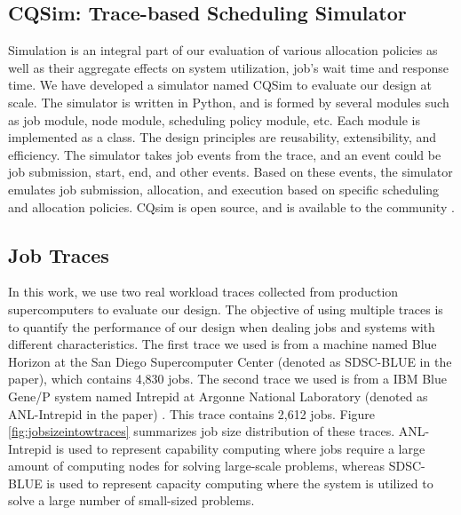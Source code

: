 \documentclass[conference]{IEEEtran}
\begin{document}
\subsection{CQSim: Trace-based Scheduling Simulator}

Simulation is an integral part of our evaluation of various allocation policies
as well as their aggregate effects on system utilization, job's wait time and
response time. We have developed a simulator named CQSim to evaluate our design
at scale. The simulator is written in Python, and is formed by several modules
such as job module, node module, scheduling policy module, etc. Each module is
implemented as a class. The design principles are reusability, extensibility,
and efficiency. The simulator takes job events from the trace, and an event could be
job submission, start, end, and other events. Based on these events, the
simulator emulates job submission, allocation, and execution based on specific
scheduling and allocation policies. CQsim is open source, and is available to the
community \cite{Cqsim}.  \\



\subsection{Job Traces}
\label{sec:job traces}

In this work, we use two real workload traces collected from production
supercomputers to evaluate our design. The objective of using multiple traces is
to quantify the performance of our design when dealing jobs and systems with
different characteristics. The first trace we used is from a machine named Blue Horizon at
the San Diego Supercomputer Center (denoted as SDSC-BLUE in the paper), which
contains 4,830 jobs. The second trace we used is from a IBM Blue Gene/P system
named Intrepid at Argonne National Laboratory (denoted as ANL-Intrepid in the paper)
\cite{par}. This trace contains 2,612 jobs. Figure \ref{fig:jobsizeintowtraces}
summarizes job size distribution of these traces. ANL-Intrepid is used to
represent capability computing where jobs require a large amount of computing
nodes for solving large-scale problems, whereas SDSC-BLUE is used to represent
capacity computing where the system is utilized to solve a large number of
small-sized problems.
\end{document}
